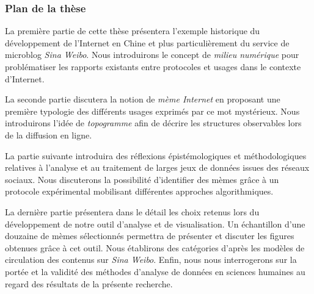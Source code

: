 \subsubsection{Plan de la thèse}

La première partie de cette thèse présentera l'exemple historique du développement de l'Internet en Chine et plus particulièrement du service de microblog \textit{Sina Weibo}. Nous introduirons le concept de \textit{milieu numérique} pour problématiser les rapports existants entre protocoles et usages dans le contexte d'Internet.

La seconde partie discutera la notion de \textit{mème Internet} en proposant une première typologie des différents usages exprimés par ce mot mystérieux. Nous introduirons l'idée de \textit{topogramme} afin de décrire les structures observables lors de la diffusion en ligne.

La partie suivante introduira des réflexions épistémologiques et méthodologiques relatives à l'analyse et au traitement de larges jeux de données issues des réseaux sociaux. Nous discuterons la possibilité d'identifier des mèmes grâce à un protocole expérimental mobilisant différentes approches algorithmiques.

La dernière partie présentera dans le détail les choix retenus lors du développement de notre outil d'analyse et de visualisation. Un échantillon d'une douzaine de mèmes sélectionnés permettra de présenter et discuter les figures obtenues grâce à cet outil. Nous établirons des catégories d'après les modèles de circulation des contenus sur \textit{Sina Weibo}. Enfin, nous nous interrogerons sur la portée et la validité des méthodes d'analyse de données en sciences humaines au regard des résultats de la présente recherche.

